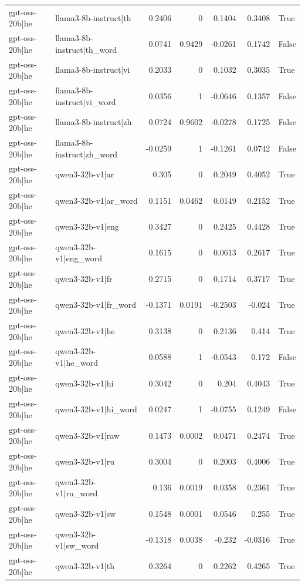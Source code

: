 \begin{table}
\begin{tabular}{l l r r r r l}
gpt-oss-20b|he & llama3-8b-instruct|th & 0.2406 & 0 & 0.1404 & 0.3408 & True \\
gpt-oss-20b|he & llama3-8b-instruct|th_word & 0.0741 & 0.9429 & -0.0261 & 0.1742 & False \\
gpt-oss-20b|he & llama3-8b-instruct|vi & 0.2033 & 0 & 0.1032 & 0.3035 & True \\
gpt-oss-20b|he & llama3-8b-instruct|vi_word & 0.0356 & 1 & -0.0646 & 0.1357 & False \\
gpt-oss-20b|he & llama3-8b-instruct|zh & 0.0724 & 0.9602 & -0.0278 & 0.1725 & False \\
gpt-oss-20b|he & llama3-8b-instruct|zh_word & -0.0259 & 1 & -0.1261 & 0.0742 & False \\
gpt-oss-20b|he & qwen3-32b-v1|ar & 0.305 & 0 & 0.2049 & 0.4052 & True \\
gpt-oss-20b|he & qwen3-32b-v1|ar_word & 0.1151 & 0.0462 & 0.0149 & 0.2152 & True \\
gpt-oss-20b|he & qwen3-32b-v1|eng & 0.3427 & 0 & 0.2425 & 0.4428 & True \\
gpt-oss-20b|he & qwen3-32b-v1|eng_word & 0.1615 & 0 & 0.0613 & 0.2617 & True \\
gpt-oss-20b|he & qwen3-32b-v1|fr & 0.2715 & 0 & 0.1714 & 0.3717 & True \\
gpt-oss-20b|he & qwen3-32b-v1|fr_word & -0.1371 & 0.0191 & -0.2503 & -0.024 & True \\
gpt-oss-20b|he & qwen3-32b-v1|he & 0.3138 & 0 & 0.2136 & 0.414 & True \\
gpt-oss-20b|he & qwen3-32b-v1|he_word & 0.0588 & 1 & -0.0543 & 0.172 & False \\
gpt-oss-20b|he & qwen3-32b-v1|hi & 0.3042 & 0 & 0.204 & 0.4043 & True \\
gpt-oss-20b|he & qwen3-32b-v1|hi_word & 0.0247 & 1 & -0.0755 & 0.1249 & False \\
gpt-oss-20b|he & qwen3-32b-v1|raw & 0.1473 & 0.0002 & 0.0471 & 0.2474 & True \\
gpt-oss-20b|he & qwen3-32b-v1|ru & 0.3004 & 0 & 0.2003 & 0.4006 & True \\
gpt-oss-20b|he & qwen3-32b-v1|ru_word & 0.136 & 0.0019 & 0.0358 & 0.2361 & True \\
gpt-oss-20b|he & qwen3-32b-v1|sw & 0.1548 & 0.0001 & 0.0546 & 0.255 & True \\
gpt-oss-20b|he & qwen3-32b-v1|sw_word & -0.1318 & 0.0038 & -0.232 & -0.0316 & True \\
gpt-oss-20b|he & qwen3-32b-v1|th & 0.3264 & 0 & 0.2262 & 0.4265 & True \\

\end{tabular}
\end{table}
